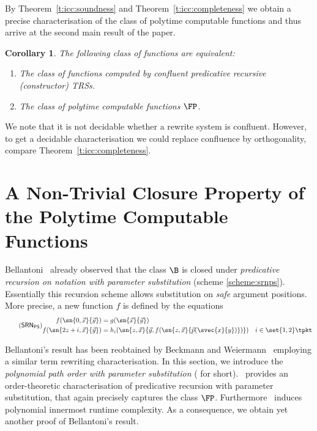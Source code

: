 \documentclass{LMCS}
\newtheorem{corollary}[thm]{Corollary}
\begin{document}
By Theorem~\ref{t:icc:soundness} and Theorem~\ref{t:icc:completeness} we obtain a
precise characterisation of the class of polytime computable functions and
thus arrive at the second main result of the paper.

\begin{corollary}\label{c:FP}
  The following class of functions are equivalent:
  \begin{enumerate}[labelsep=*,leftmargin=*]
  \item The class of functions computed by confluent predicative recursive (constructor) TRSs.
  \item The class of polytime computable functions $\FP$. 
  \end{enumerate}
\end{corollary}
We note that it is not decidable whether a rewrite system is confluent. However, 
to get a decidable characterisation we could replace confluence by orthogonality, compare 
Theorem~\ref{t:icc:completeness}.





\section{A Non-Trivial Closure Property of the Polytime Computable Functions}\label{s:popstarps}

Bellantoni~\cite{B:92} already observed that the class $\B$ is closed under
\emph{predicative recursion on notation with parameter substitution} (scheme \eqref{scheme:srnps}). 
Essentially this recursion scheme allows substitution on \emph{safe} argument positions. More precise, 
a new function $f$ is defined by the equations
\begin{equation}
  \label{scheme:srnps} \tag{\ensuremath{\mathsf{SRN_{PS}}}}
  \begin{aligned}
   f(\sn{0,\vec{x}}{\vec{y}}) & = g(\sn{\vec{x}}{\vec{y}}) \\
   f(\sn{2z + i,\vec{x}}{\vec{y}}) & = 
   h_i(\sn{z,\vec{x}}{\vec{y},f(\sn{z,\vec{x}}{\vec{p}(\svec{x}{y})})}) 
   \quad i \in \set{1,2} \tpkt
  \end{aligned}
\end{equation}

Bellantoni's result has been reobtained by Beckmann and 
Weiermann~\cite[Corollary~5.4]{BW96} employing a similar
term rewriting characterisation. In this section, we introduce
the \emph{polynomial path order with parameter substitution} (\emph{\POPSTARP} for short).
\POPSTARP\ provides an order-theoretic characterisation of
predicative recursion with parameter substitution, that again precisely
captures the class $\FP$. Furthermore \POPSTARP\ induces polynomial
innermost runtime complexity. As a consequence, we obtain yet another proof
of Bellantoni's result.
\end{document}
